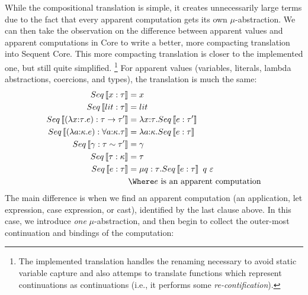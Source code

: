 \documentclass{article}
\begin{document}
While the compositional translation is simple, it creates unnecessarily large
terms due to the fact that every apparent computation gets its own
$\mu$-abstraction.  We can then take the observation on the difference between
apparent values and apparent computations in Core to write a better, more
compacting translation into Sequent Core.  This more compacting translation is
closer to the implemented one, but still quite simplified.%
\footnote{The implemented translation handles the renaming necessary to avoid
  static variable capture and also attemps to translate functions which
  represent continuations as continuations (i.e., it performs some
  \emph{re-contification}).}
For apparent values (variables, literals, lambda abstractions, coercions, and
types), the translation is much the same:
\begin{align*}
  Seq\trans{x : \ty} &= x
  \\
  Seq\trans{\lit : \ty} &= \lit
  \\
  Seq\trans{(\fn{\ann{x}{\ty}} \expr) : \ty \to \ty'}
  &=
  \fn{\ann{x}{\ty}} Seq\trans{\expr : \ty'}
  \\
  Seq\trans{(\fn{\ann{a}{\ki}} \expr) : \forall \ann{a}{\ki}. \ty}
  &=
  \fn{\ann{a}{\ki}} Seq\trans{\expr : \ty}
  \\
  Seq\trans{\cn : \eqty{\ty}{\ty'}} &= \cn
  \\
  Seq\trans{\ty : \ki} &= \ty
  \\
  Seq\trans{\expr : \ty}
  &= \comp{q:\ty} Seq\trans{\expr : \ty} ~ q ~ \mt
  \\
  &
  \Where \expr \text{ is an apparent computation}
\end{align*}
The main difference is when we find an apparent computation (an application, let
expression, case expression, or cast), identified by the last clause above.  In
this case, we introduce \emph{one} $\mu$-abstraction, and then begin to collect
the outer-most continuation and bindings of the computation:
\end{document}

